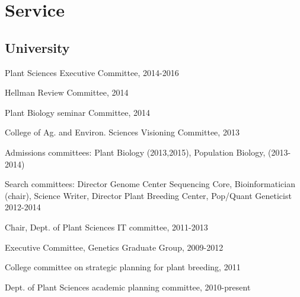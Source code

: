\documentclass[letterpaper]{article}
\renewenvironment{itemize}{
  \begin{list}{}{
    \setlength{\leftmargin}{1.5em}
  }
}{
  \end{list}
}
\begin{document}
\section*{Service}
\begin{itemize}
\subsection*{University}
\item Plant Sciences Executive Committee, 2014-2016
\item Hellman Review Committee, 2014
\item Plant Biology seminar Committee, 2014
\item College of Ag. and Environ. Sciences Visioning Committee, 2013
\item Admissions committees: Plant Biology (2013,2015), Population Biology, (2013-2014)
\item Search committees: Director Genome Center Sequencing Core, Bioinformatician (chair), Science Writer, Director Plant Breeding Center, Pop/Quant Geneticist 2012-2014
\item Chair, Dept. of Plant Sciences IT committee, 2011-2013
\item Executive Committee, Genetics Graduate Group, 2009-2012
\item College committee on strategic planning for plant breeding, 2011
\item Dept. of Plant Sciences academic planning committee, 2010-present


\end{itemize}
\end{document}

